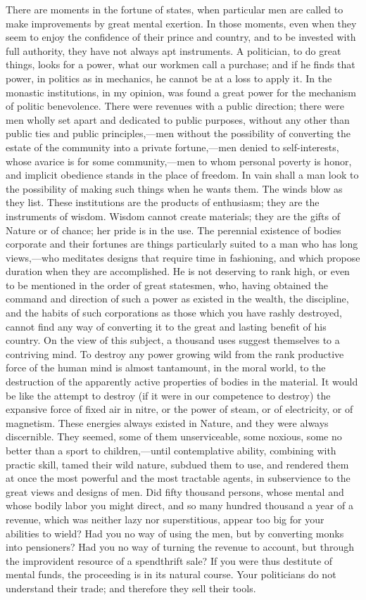 There are moments in the fortune of states, when particular men are called to make improvements by great mental exertion. In those moments, even when they seem to enjoy the confidence of their prince and country, and to be invested with full authority, they have not always apt instruments. A politician, to do great things, looks for a power, what our workmen call a purchase; and if he finds that power, in politics as in mechanics, he cannot be at a loss to apply it. In the monastic institutions, in my opinion, was found a great power for the mechanism of politic benevolence. There were revenues with a public direction; there were men wholly set apart and dedicated to public purposes, without any other than public ties and public principles,—men without the possibility of converting the estate of the community into a private fortune,—men denied to self-interests, whose avarice is for some community,—men to whom personal poverty is honor, and implicit obedience stands in the place of freedom. In vain shall a man look to the possibility of making such things when he wants them. The winds blow as they list. These institutions are the products of enthusiasm; they are the instruments of wisdom. Wisdom cannot create materials; they are the gifts of Nature or of chance; her pride is in the use. The perennial existence of bodies corporate and their fortunes are things particularly suited to a man who has long views,—who meditates designs that require time in fashioning, and which propose duration when they are accomplished. He is not deserving to rank high, or even to be mentioned in the order of great statesmen, who, having obtained the command and direction of such a power as existed in the wealth, the discipline, and the habits of such corporations as those which you have rashly destroyed, cannot find any way of converting it to the great and lasting benefit of his country. On the view of this subject, a thousand uses suggest themselves to a contriving mind. To destroy any power growing wild from the rank productive force of the human mind is almost tantamount, in the moral world, to the destruction of the apparently active properties of bodies in the material. It would be like the attempt to destroy (if it were in our competence to destroy) the expansive force of fixed air in nitre, or the power of steam, or of electricity, or of magnetism. These energies always existed in Nature, and they were always discernible. They seemed, some of them unserviceable, some noxious, some no better than a sport to children,—until contemplative ability, combining with practic skill, tamed their wild nature, subdued them to use, and rendered them at once the most powerful and the most tractable agents, in subservience to the great views and designs of men. Did fifty thousand persons, whose mental and whose bodily labor you might direct, and so many hundred thousand a year of a revenue, which was neither lazy nor superstitious, appear too big for your abilities to wield? Had you no way of using the men, but by converting monks into pensioners? Had you no way of turning the revenue to account, but through the improvident resource of a spendthrift sale? If you were thus destitute of mental funds, the proceeding is in its natural course. Your politicians do not understand their trade; and therefore they sell their tools.

